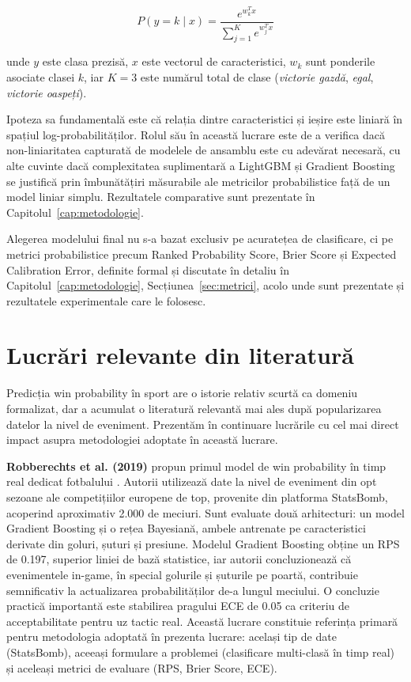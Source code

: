\begin{equation}
    P(y = k \mid x) = \frac{e^{w_k^T x}}{\sum_{j=1}^{K} e^{w_j^T x}}
\end{equation}

unde $y$ este clasa prezisă, $x$ este vectorul de caracteristici, $w_k$ sunt
ponderile asociate clasei $k$, iar $K = 3$ este numărul total de clase
(\textit{victorie gazdă}, \textit{egal}, \textit{victorie oaspeți}).

Ipoteza sa fundamentală este că relația dintre caracteristici și ieșire este
liniară în spațiul log-probabilităților. Rolul său în această lucrare este
de a verifica dacă non-liniaritatea capturată de modelele de ansamblu este
cu adevărat necesară, cu alte cuvinte dacă complexitatea suplimentară
a LightGBM și Gradient Boosting se justifică prin îmbunătățiri măsurabile
ale metricilor probabilistice față de un model liniar simplu. Rezultatele
comparative sunt prezentate în Capitolul~\ref{cap:metodologie}.

Alegerea modelului final nu s-a bazat exclusiv pe acuratețea de
clasificare, ci pe metrici probabilistice precum Ranked Probability Score,
Brier Score și Expected Calibration Error, definite formal și discutate în
detaliu în Capitolul~\ref{cap:metodologie}, Secțiunea~\ref{sec:metrici},
acolo unde sunt prezentate și rezultatele experimentale care le folosesc.

\section{Lucrări relevante din literatură}
\label{sec:literatura}

Predicția win probability în sport are o istorie relativ scurtă ca domeniu
formalizat, dar a acumulat o literatură relevantă mai ales după
popularizarea datelor la nivel de eveniment. Prezentăm în continuare
lucrările cu cel mai direct impact asupra metodologiei adoptate în această
lucrare.

\textbf{Robberechts et al. (2019)} propun primul model de win probability
în timp real dedicat fotbalului \cite{Robberechts2019}. Autorii utilizează
date la nivel de eveniment din opt sezoane ale competițiilor europene de
top, provenite din platforma StatsBomb, acoperind aproximativ 2.000 de
meciuri. Sunt evaluate două arhitecturi: un model Gradient Boosting și o
rețea Bayesiană, ambele antrenate pe caracteristici derivate din goluri,
șuturi și presiune. Modelul Gradient Boosting obține un RPS de 0.197,
superior liniei de bază statistice, iar autorii concluzionează că
evenimentele in-game, în special golurile și șuturile pe poartă, contribuie
semnificativ la actualizarea probabilităților de-a lungul meciului.
O concluzie practică importantă este stabilirea pragului ECE de 0.05 ca
criteriu de acceptabilitate pentru uz tactic real. Această lucrare
constituie referința primară pentru metodologia adoptată în prezenta
lucrare: același tip de date (StatsBomb), aceeași formulare a problemei
(clasificare multi-clasă în timp real) și aceleași metrici de evaluare
(RPS, Brier Score, ECE).

